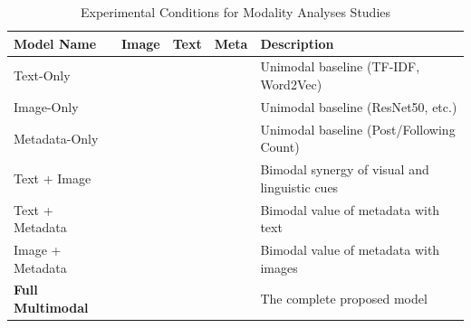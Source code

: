 \begin{table}[H]
	\centering
	\caption{Experimental Conditions for Modality Analyses Studies}
	\label{tab:ablation_conditions}
	\begin{tabularx}{\textwidth}{l c c c X} 
		\hline
		\textbf{Model Name} & \textbf{Image} & \textbf{Text} & \textbf{Meta} & \textbf{Description} \\ \hline
		Text-Only & & \checkmark & & Unimodal baseline (TF-IDF, Word2Vec) \\
		Image-Only & \checkmark & & & Unimodal baseline (ResNet50, etc.) \\
		Metadata-Only & & & \checkmark & Unimodal baseline (Post/Following Count) \\
		Text + Image & \checkmark & \checkmark & & Bimodal synergy of visual and linguistic cues \\
		Text + Metadata & & \checkmark & \checkmark & Bimodal value of metadata with text \\
		Image + Metadata & \checkmark & & \checkmark & Bimodal value of metadata with images \\
		\textbf{Full Multimodal} & \checkmark & \checkmark & \checkmark & The complete proposed model \\ \hline
	\end{tabularx}
\end{table}
